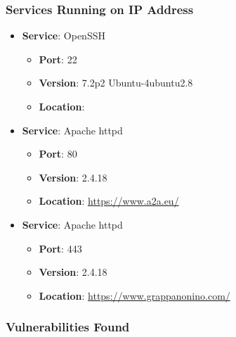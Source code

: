 \documentclass{article}
\begin{document}
\subsubsection*{Services Running on IP Address}

\begin{itemize}
    
        \item \textbf{Service}: OpenSSH
        \begin{itemize}
            \item \textbf{Port}: 22
            \item \textbf{Version}:  7.2p2 Ubuntu-4ubuntu2.8 
            \item \textbf{Location}: \href{  }{  }
        \end{itemize}
    
        \item \textbf{Service}: Apache httpd
        \begin{itemize}
            \item \textbf{Port}: 80
            \item \textbf{Version}:  2.4.18 
            \item \textbf{Location}: \href{ https://www.a2a.eu/ }{ https://www.a2a.eu/ }
        \end{itemize}
    
        \item \textbf{Service}: Apache httpd
        \begin{itemize}
            \item \textbf{Port}: 443
            \item \textbf{Version}:  2.4.18 
            \item \textbf{Location}: \href{ https://www.grappanonino.com/ }{ https://www.grappanonino.com/ }
        \end{itemize}
    
\end{itemize}


\subsubsection*{Vulnerabilities Found}
\end{document}
